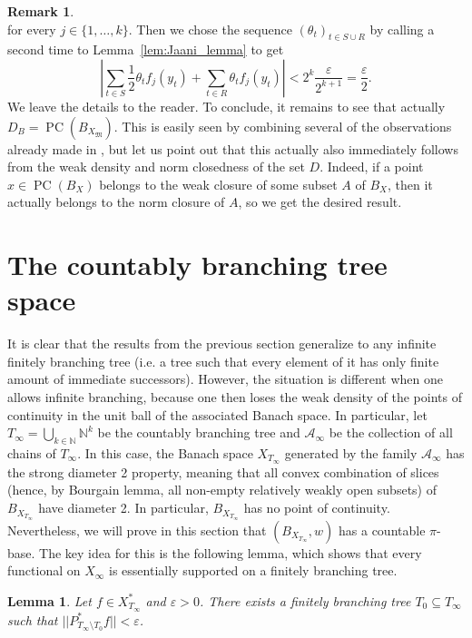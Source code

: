 \documentclass[11pt,a4paper,reqno]{amsart}
\numberwithin{equation}{section}
\newcommand{\abs}[1]{\left\lvert#1\right\rvert}
\newcommand{\N}{\mathbb{N}}
\newcommand{\A}{\mathcal{A}}
\newcommand{\eps}{\varepsilon}
\DeclareMathOperator{\PC}{PC}
\newcommand{\1}{\mathbbm{1}}
\theoremstyle{plain}
\newtheorem{lemma}[theorem]{Lemma}
\theoremstyle{definition}
\newtheorem{remark}[theorem]{Remark}
\begin{document}
\begin{remark}
\begin{equation*}
    \end{equation*} for every $j\in\{1,\dots,k\}$. Then we chose the sequence $(\theta_t)_{t\in S\cup R}$ by calling a second time to Lemma~\ref{lem:Jaani_lemma} to get \begin{equation*}
        \abs{\sum_{t\in S}\frac{1}{2}\theta_tf_j(y_t)+\sum_{t\in R}\theta_tf_j(y_t)}<2^k\frac{\eps}{2^{k+1}}=\frac{\eps}{2}. 
    \end{equation*} We leave the details to the reader. To conclude, it remains to see that actually $D_B=\PC(B_{X_\mathfrak{M}})$. This is easily seen by combining several of the observations already made in \cite{ALMT}, but let us point out that this actually also immediately follows from the weak density and norm closedness of the set $D$. Indeed, if a point $x\in \PC(B_X)$ belongs to the weak closure of some subset $A$ of $B_X$, then it actually belongs to the norm closure of $A$, so we get the desired result. 
\end{remark}


\section{The countably branching tree space}\label{section:countably_branching_tree_space}

It is clear that the results from the previous section generalize to any infinite finitely branching tree (i.e. a tree such that every element of it has only finite amount of immediate successors). However, the situation is different when one allows infinite branching, because one then loses the weak density of the points of continuity in the unit ball of the associated Banach space. In particular, let
 $T_{\infty}=\bigcup_{k\in\N}\N^k$ be the countably branching tree and $\A_\infty$ be the collection of all chains of $T_{\infty}$. In this case, the Banach space $X_{T_\infty}$ generated by the family $\A_\infty$ has the strong diameter 2 property, meaning that all convex combination of slices (hence, by Bourgain lemma, all non-empty relatively weakly open subsets) of $B_{X_{T_\infty}}$ have diameter 2. In particular, $B_{X_{T_\infty}}$ has no point of continuity. Nevertheless, we will prove in this section that $(B_{X_{T_\infty}},w)$ has a countable $\pi$-base. The key idea for this is the following lemma, which shows that every functional on $X_\infty$ is essentially supported on a finitely branching tree.

\begin{lemma}\label{lemma:functinals_on_X_infty_are_essentially_supported_on_a_finitely_branching_tree}
    Let $f\in X_{T_\infty}^*$ and $\varepsilon>0$. There exists a finitely branching tree $T_0\subseteq T_{\infty}$ such that $||P^{*}_{T_{\infty}\setminus T_0}f||<\varepsilon$.
\end{lemma}
\end{document}
